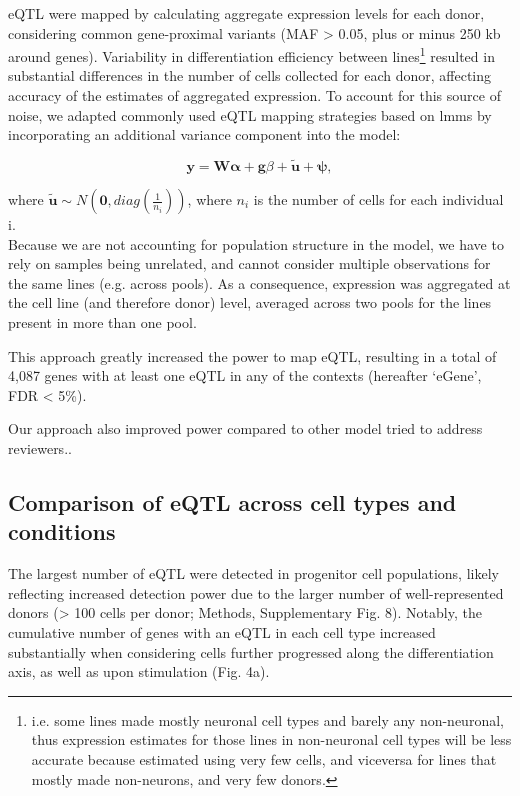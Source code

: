 eQTL were mapped by calculating aggregate expression levels for each donor, considering common gene-proximal variants (MAF > 0.05, plus or minus 250 kb around genes). 
Variability in differentiation efficiency between lines\footnote{i.e. some lines made mostly neuronal cell types and barely any non-neuronal, thus expression estimates for those lines in non-neuronal cell types will be less accurate because estimated using very few cells, and viceversa for lines that mostly made non-neurons, and very few donors.} resulted in substantial differences in the number of cells collected for each donor, affecting accuracy of the estimates of aggregated expression. 
To account for this source of noise, we adapted commonly used eQTL mapping strategies \cite{cuomo2020single} based on \glspl{lmm} by incorporating an additional variance component into the model:

\begin{equation}
    \mathbf{y} = \mathbf{W}\boldsymbol{\alpha} + \mathbf{g}\beta + \tilde{\mathbf{u}} + \boldsymbol{\psi}, 
\end{equation}

where $\tilde{\mathbf{u}} \sim N(\mathbf{0}, diag(\frac{1}{n_i}))$, where $n_i$ is the number of cells for each individual i.\\

Because we are not accounting for population structure in the model, we have to rely on samples being unrelated, and cannot consider multiple observations for the same lines (e.g. across pools). 
As a consequence, expression was aggregated at the cell line (and therefore donor) level, averaged across two pools for the lines present in more than one pool.

This approach greatly increased the power to map eQTL, resulting in a total of 4,087 genes with at least one eQTL in any of the contexts (hereafter `eGene', FDR < 5\%).

Our approach also improved power compared to other model tried to address reviewers..

\subsection{Comparison of eQTL across cell types and conditions}

The largest number of eQTL were detected in progenitor cell populations, likely reflecting increased detection power due to the larger number of well-represented donors (> 100 cells per donor; Methods, Supplementary Fig. 8). 
Notably, the cumulative number of genes with an eQTL in each cell type increased substantially when considering cells further progressed along the differentiation axis, as well as upon stimulation (Fig. 4a). 


